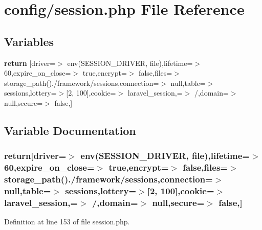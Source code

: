 \section{config/session.php File Reference}
\label{config_2session_8php}
\subsection*{Variables}
\begin{DoxyCompactItemize}
\item 
{\bf return} [\textquotesingle{}driver\textquotesingle{}=$>$ env(\textquotesingle{}S\+E\+S\+S\+I\+O\+N\+\_\+\+D\+R\+I\+V\+E\+R\textquotesingle{}, \textquotesingle{}file\textquotesingle{}),\textquotesingle{}lifetime\textquotesingle{}=$>$ 60,\textquotesingle{}expire\+\_\+on\+\_\+close\textquotesingle{}=$>$ true,\textquotesingle{}encrypt\textquotesingle{}=$>$ false,\textquotesingle{}files\textquotesingle{}=$>$ storage\+\_\+path().\textquotesingle{}/framework/sessions\textquotesingle{},\textquotesingle{}connection\textquotesingle{}=$>$ null,\textquotesingle{}table\textquotesingle{}=$>$ \textquotesingle{}sessions\textquotesingle{},\textquotesingle{}lottery\textquotesingle{}=$>$[2, 100],\textquotesingle{}cookie\textquotesingle{}=$>$ \textquotesingle{}laravel\+\_\+session\textquotesingle{},\textquotesingle{}=$>$ \textquotesingle{}/\textquotesingle{},\textquotesingle{}domain\textquotesingle{}=$>$ null,\textquotesingle{}secure\textquotesingle{}=$>$ false,]
\end{DoxyCompactItemize}


\subsection{Variable Documentation}
\subsubsection[{return}]{\setlength{\rightskip}{0pt plus 5cm}return[\textquotesingle{}driver\textquotesingle{}=$>$ env(\textquotesingle{}S\+E\+S\+S\+I\+O\+N\+\_\+\+D\+R\+I\+V\+E\+R\textquotesingle{}, \textquotesingle{}file\textquotesingle{}),\textquotesingle{}lifetime\textquotesingle{}=$>$ 60,\textquotesingle{}expire\+\_\+on\+\_\+close\textquotesingle{}=$>$ true,\textquotesingle{}encrypt\textquotesingle{}=$>$ false,\textquotesingle{}files\textquotesingle{}=$>$ storage\+\_\+path().\textquotesingle{}/framework/sessions\textquotesingle{},\textquotesingle{}connection\textquotesingle{}=$>$ null,\textquotesingle{}table\textquotesingle{}=$>$ \textquotesingle{}sessions\textquotesingle{},\textquotesingle{}lottery\textquotesingle{}=$>$[2, 100],\textquotesingle{}cookie\textquotesingle{}=$>$ \textquotesingle{}laravel\+\_\+session\textquotesingle{},\textquotesingle{}=$>$ \textquotesingle{}/\textquotesingle{},\textquotesingle{}domain\textquotesingle{}=$>$ null,\textquotesingle{}secure\textquotesingle{}=$>$ false,]}\label{config_2session_8php_a9f69ac780499da341ad61177ef220e36}


Definition at line 153 of file session.\+php.

